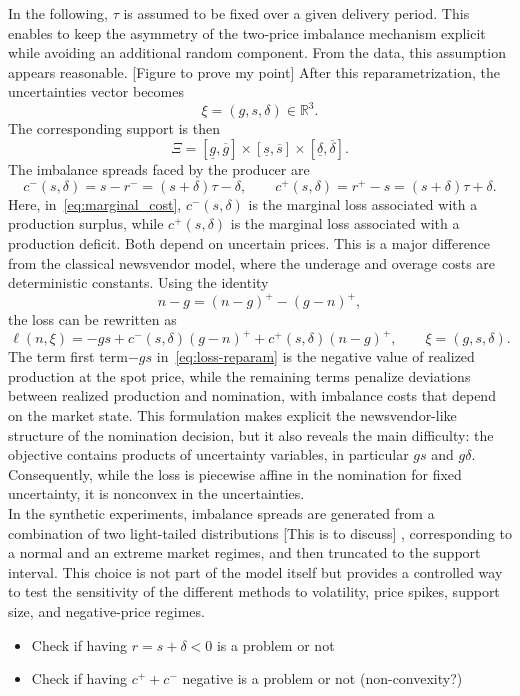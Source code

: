 \documentclass[11pt]{article}
\newcommand{\R}{\mathbb{R}}
\newcommand{\XiSet}{\Xi}
\theoremstyle{plain}
\theoremstyle{definition}
\begin{document}
\noindent In the following, $\tau$ is assumed to be fixed over a given delivery period.
This enables to keep the asymmetry of the two-price imbalance mechanism explicit while avoiding an additional random component. 
From the data, this assumption appears reasonable. \color{red}[Figure to prove my point] \color{black}
After this reparametrization, the uncertainties vector becomes
\[
    \xi=(g,s,\delta)\in\R^3.
\]
The corresponding support is then
\[
    \XiSet
    =
    [\underline g,\overline g]
    \times
    [\underline s,\overline s]
    \times
    [\underline\delta,\overline\delta].
\]
The imbalance spreads faced by the producer are
\begin{equation}\label{eq:marginal_cost}
    c^-(s,\delta)
    =
    s-r^-
    =
    (s+\delta)\tau-\delta,
    \qquad
    c^+(s,\delta)
    =
    r^+-s
    =
    (s+\delta)\tau+\delta .
\end{equation}
Here, in~\eqref{eq:marginal_cost}, $c^-(s,\delta)$ is the marginal loss associated with a production surplus, while $c^+(s,\delta)$ is the marginal loss associated with a production deficit. 
Both depend on uncertain prices. 
This is a major difference from the classical newsvendor model, where the underage and overage costs are deterministic constants.
Using the identity
\[
    n-g=(n-g)^+-(g-n)^+,
\]
the loss can be rewritten as
\begin{equation}
    \label{eq:loss-reparam}
    \ell(n,\xi)
    =
    -gs
    +
    c^-(s,\delta)(g-n)^+
    +
    c^+(s,\delta)(n-g)^+,
    \qquad
    \xi=(g,s,\delta).
\end{equation}
The term first term$-gs$ in~\eqref{eq:loss-reparam} is the negative value of realized production at the spot price, while the remaining terms penalize deviations between realized production and nomination, with imbalance costs that depend on the market state. 
This formulation makes explicit the newsvendor-like structure of the nomination decision, but it also reveals the main difficulty: the objective contains products of uncertainty variables, in particular $gs$ and $g\delta$. 
Consequently, while the loss is piecewise affine in the nomination for fixed uncertainty, it is nonconvex in the uncertainties. 
\\

\noindent In the synthetic experiments, imbalance spreads are generated from a combination of two light-tailed distributions \color{red}[This is to discuss] \color{black}, corresponding to a normal and an extreme market regimes, and then truncated to the support interval. 
This choice is not part of the model itself but provides a controlled way to test the sensitivity of the different methods to volatility, price spikes, support size, and negative-price regimes.
\color{red}
\begin{itemize}
    \item Check if having $r=s+\delta<0$ is a problem or not
    \item Check if having $c^+ + c^-$ negative is a problem or not (non-convexity?)
\end{itemize}
\color{black}
\end{document}
